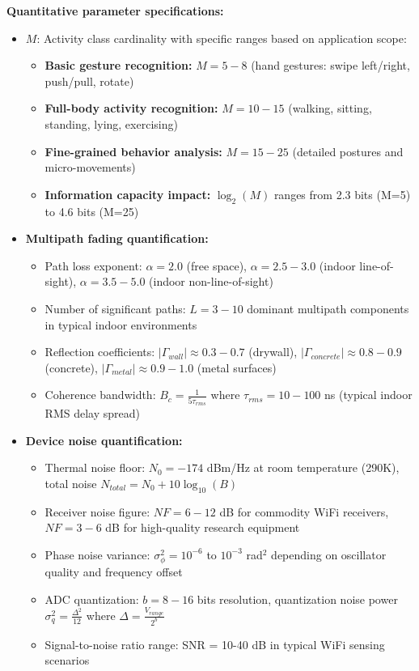 \documentclass[12pt,a4paper]{article}
\begin{document}
\textbf{Quantitative parameter specifications:}
\begin{itemize}
\item $M$: Activity class cardinality with specific ranges based on application scope:
\begin{itemize}
\item \textbf{Basic gesture recognition:} $M = 5-8$ (hand gestures: swipe left/right, push/pull, rotate)
\item \textbf{Full-body activity recognition:} $M = 10-15$ (walking, sitting, standing, lying, exercising)
\item \textbf{Fine-grained behavior analysis:} $M = 15-25$ (detailed postures and micro-movements)
\item \textbf{Information capacity impact:} $\log_2(M)$ ranges from 2.3 bits (M=5) to 4.6 bits (M=25)
\end{itemize}
\item \textbf{Multipath fading quantification:}
\begin{itemize}
\item Path loss exponent: $\alpha = 2.0$ (free space), $\alpha = 2.5-3.0$ (indoor line-of-sight), $\alpha = 3.5-5.0$ (indoor non-line-of-sight)
\item Number of significant paths: $L = 3-10$ dominant multipath components in typical indoor environments
\item Reflection coefficients: $|\Gamma_{wall}| \approx 0.3-0.7$ (drywall), $|\Gamma_{concrete}| \approx 0.8-0.9$ (concrete), $|\Gamma_{metal}| \approx 0.9-1.0$ (metal surfaces)
\item Coherence bandwidth: $B_c = \frac{1}{5\tau_{rms}}$ where $\tau_{rms} = 10-100$ ns (typical indoor RMS delay spread)
\end{itemize}
\item \textbf{Device noise quantification:}
\begin{itemize}
\item Thermal noise floor: $N_0 = -174$ dBm/Hz at room temperature (290K), total noise $N_{total} = N_0 + 10\log_{10}(B)$
\item Receiver noise figure: $NF = 6-12$ dB for commodity WiFi receivers, $NF = 3-6$ dB for high-quality research equipment
\item Phase noise variance: $\sigma_{\phi}^2 = 10^{-6}$ to $10^{-3}$ rad$^2$ depending on oscillator quality and frequency offset
\item ADC quantization: $b = 8-16$ bits resolution, quantization noise power $\sigma_q^2 = \frac{\Delta^2}{12}$ where $\Delta = \frac{V_{range}}{2^b}$
\item Signal-to-noise ratio range: SNR = 10-40 dB in typical WiFi sensing scenarios
\end{itemize}
\end{itemize}
\end{document}
